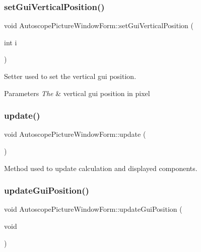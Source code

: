 \subsubsection{\texorpdfstring{setGuiVerticalPosition()}{setGuiVerticalPosition()}}
{\footnotesize\ttfamily void Autoscope\+Picture\+Window\+Form\+::set\+Gui\+Vertical\+Position (\begin{DoxyParamCaption}\item[{int}]{i }\end{DoxyParamCaption})}



Setter used to set the vertical gui position. 


\begin{DoxyParams}{Parameters}
{\em The} & vertical gui position in pixel \\
\hline
\end{DoxyParams}
\mbox{\label{class_autoscope_picture_window_form_a84ad64e4121c67a3269f935e50cfee2c}} 
\subsubsection{\texorpdfstring{update()}{update()}}
{\footnotesize\ttfamily void Autoscope\+Picture\+Window\+Form\+::update (\begin{DoxyParamCaption}{ }\end{DoxyParamCaption})}



Method used to update calculation and displayed components. 

\mbox{\label{class_autoscope_picture_window_form_aa9b0990a5e7fa9d0bedeaab959b999c6}} 
\subsubsection{\texorpdfstring{updateGuiPosition()}{updateGuiPosition()}}
{\footnotesize\ttfamily void Autoscope\+Picture\+Window\+Form\+::update\+Gui\+Position (\begin{DoxyParamCaption}\item[{void}]{ }\end{DoxyParamCaption})}



